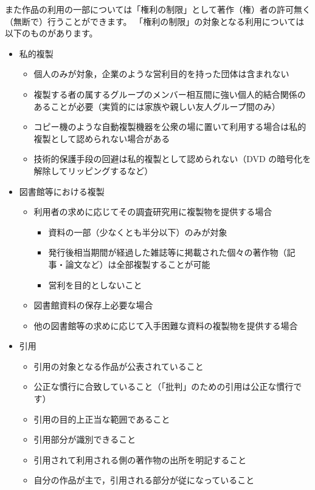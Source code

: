 \documentclass{ltjsarticle}
\begin{document}
また作品の利用の一部については「権利の制限」として著作（権）者の許可無く（無断で）行うことができます。
「権利の制限」の対象となる利用については以下のものがあります。
\begin{itemize}
\item 私的複製
      \begin{itemize}
      \item 個人のみが対象，企業のような営利目的を持った団体は含まれない
      \item 複製する者の属するグループのメンバー相互間に強い個人的結合関係のあることが必要（実質的には家族や親しい友人グループ間のみ）
      \item コピー機のような自動複製機器を公衆の場に置いて利用する場合は私的複製として認められない場合がある
      \item 技術的保護手段の回避は私的複製として認められない（DVD の暗号化を解除してリッピングするなど）
      \end{itemize}
\item 図書館等における複製
      \begin{itemize}
      \item 利用者の求めに応じてその調査研究用に複製物を提供する場合
            \begin{itemize}
            \item 資料の一部（少なくとも半分以下）のみが対象
            \item 発行後相当期間が経過した雑誌等に掲載された個々の著作物（記事・論文など）は全部複製することが可能
            \item 営利を目的としないこと
            \end{itemize}
      \item 図書館資料の保存上必要な場合
      \item 他の図書館等の求めに応じて入手困難な資料の複製物を提供する場合
      \end{itemize}
\item 引用
      \begin{itemize}
      \item 引用の対象となる作品が公表されていること
      \item 公正な慣行に合致していること（「批判」のための引用は公正な慣行です）
      \item 引用の目的上正当な範囲であること
      \item 引用部分が識別できること
      \item 引用されて利用される側の著作物の出所を明記すること
      \item 自分の作品が主で，引用される部分が従になっていること

\end{itemize}
\end{itemize}
\end{document}
